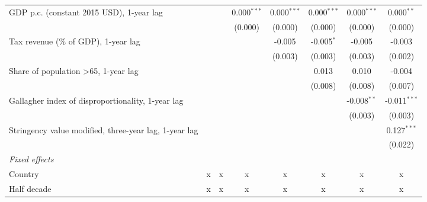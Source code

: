 \begin{table}[htbp]
\begin{tabular}{lccccccc}
      GDP p.c. (constant 2015 USD), 1-year lag                         &                &                & 0.000$^{***}$  & 0.000$^{***}$  & 0.000$^{***}$  & 0.000$^{***}$  & 0.000$^{**}$\\   
                                                                       &                &                & (0.000)        & (0.000)        & (0.000)        & (0.000)        & (0.000)\\   
      Tax revenue (\% of GDP), 1-year lag                              &                &                &                & -0.005         & -0.005$^{*}$   & -0.005         & -0.003\\   
                                                                       &                &                &                & (0.003)        & (0.003)        & (0.003)        & (0.002)\\   
      Share of population >65, 1-year lag                              &                &                &                &                & 0.013          & 0.010          & -0.004\\   
                                                                       &                &                &                &                & (0.008)        & (0.008)        & (0.007)\\   
      Gallagher index of disproportionality, 1-year lag                &                &                &                &                &                & -0.008$^{**}$  & -0.011$^{***}$\\   
                                                                       &                &                &                &                &                & (0.003)        & (0.003)\\   
      Stringency value modified, three-year lag, 1-year lag            &                &                &                &                &                &                & 0.127$^{***}$\\   
                                                                       &                &                &                &                &                &                & (0.022)\\   
      \emph{Fixed effects}\\
      Country                                                          & x              & x              & x              & x              & x              & x              & x\\  
      Half decade                                                      & x              & x              & x              & x              & x              & x              & x\\  

\end{tabular}
\end{table}
